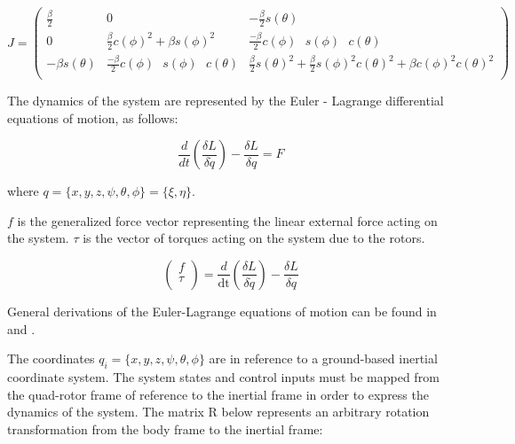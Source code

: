 \begin{equation}
\label{J}
J= \left(
\begin{array}{ccc}
 \frac{\beta }{2}    & 0                                                                    & -\frac{\beta }{2}s(\theta) \\
 0                   & \frac{\beta}{2} c(\phi)^2 + \beta s(\phi)^2                       & \frac{- \beta}{2} c(\phi) \text{ } s(\phi) \text{ } c(\theta)  \\
 -\beta s(\theta)   & \frac{- \beta}{2} c(\phi) \text{ } s(\phi) \text{ } c(\theta)    & \frac{\beta }{2}s(\theta)^2 + \frac{\beta }{2} s(\phi)^2  c(\theta)^2 + \beta  c(\phi)^2  c(\theta)^2  \\
\end{array}
\right)
\end{equation}




\noindent The dynamics of the system are represented by the Euler - Lagrange differential equations of motion, as follows:

\begin{equation}
    \frac{d}{dt} \left( \frac{\delta  L} {\delta \dot{q}}\right) - \frac{\delta  L}{\delta q}=F
\end{equation}


where $ q = \{x,y,z,\psi ,\theta ,\phi \} = \{ \xi , \eta \}  $.


\noindent  $ f $ is the generalized force vector representing the linear external force acting on the system.
$\tau $ is the vector of torques acting on the system due to the rotors.

\begin{equation}
    \left( \begin{array}{c} f \\ \tau \\ \end{array} \right) = \frac{d}{\text{dt}} \left( \frac{\delta  L} {\delta \dot{q}}\right) - \frac{\delta  L}{\delta q}
\end{equation}

General derivations of the Euler-Lagrange equations of motion can be found in \cite{marion1995classical} and  \cite{cornelius1970variational}.

The coordinates  $ q_i=\{x,y,z,\psi ,\theta ,\phi \} $  are in reference to a ground-based inertial coordinate system. The system states and control inputs must be mapped from the quad-rotor frame of reference to the inertial frame in order to express the dynamics of the system. The matrix R below represents an arbitrary rotation transformation from the body frame to the inertial frame:


